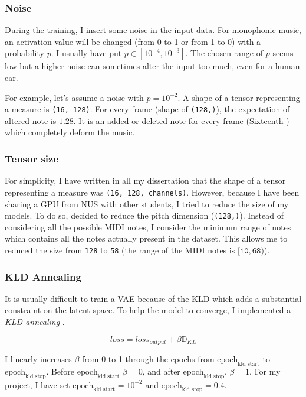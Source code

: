 \documentclass[12pt]{report}
\begin{document}
\subsubsection{Noise}

During the training, I insert some noise in the input data.
For monophonic music, an activation value will be changed (from 0 to 1 or from 1 to 0) with a probability $p$.
I usually have put $p \in [10^{-4}, 10^{-3}]$.
The chosen range of $p$ seems low but a higher noise can sometimes alter the input too much, even for a human ear.

For example, let's assume a noise with $p = 10^{-2}$.
A shape of a tensor representing a measure is \texttt{(16, 128)}.
For every frame (shape of \texttt{(128,)}), the expectation of altered note is $1.28$.
It is an added or deleted note for every frame (Sixteenth \musSixteenth) which completely deform the music.

\subsubsection{Tensor size}

For simplicity, I have written in all my dissertation that the shape of a tensor representing a measure was \texttt{(16, 128, channels)}.
However, because I have been sharing a GPU from NUS with other students, I tried to reduce the size of my models.
To do so, decided to reduce the pitch dimension (\texttt{(128,)}).
Instead of considering all the possible MIDI notes, I consider the minimum range of notes which contains all the notes actually present in the dataset.
This allows me to reduced the size from \texttt{128} to \texttt{58} (the range of the MIDI notes is $[\texttt{10}, \texttt{68})$).


\subsubsection{KLD Annealing}
\label{appendix:kld-annealing}

It is usually difficult to train a VAE because of the KLD which adds a substantial constraint on the latent space.
To help the model to converge, I implemented a \textit{KLD annealing} \cite{huang_improving_2018}.

\begin{equation}
    loss = loss_{output} + \beta \mathbb{D}_{KL}
\end{equation}

I linearly increases $\beta$ from 0 to 1 through the epochs from $\text{epoch}_{\text{kld start}}$ to $\text{epoch}_{\text{kld stop}}$.
Before $\text{epoch}_{\text{kld start}}$ $\beta = 0$, and after $\text{epoch}_{\text{kld stop}}$, $\beta = 1$.
For my project, I have set $\text{epoch}_{\text{kld start}} = 10^{-2}$ and $\text{epoch}_{\text{kld stop}} = 0.4$.
\end{document}
